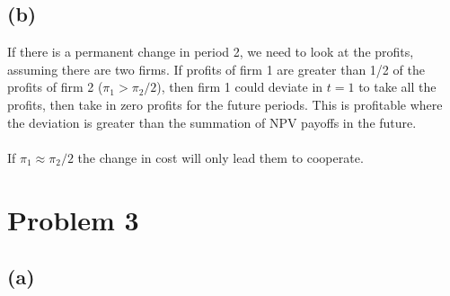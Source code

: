 \documentclass{article}
\begin{document}
\subsection*{(b)}
If there is a permanent change in period 2, we need to look at the profits, assuming there are two firms. If profits of firm 1 are greater than 1/2 of the profits of firm 2 ($\pi_1 > \pi_2/2$), then firm 1 could deviate in $t=1$ to take all the profits, then take in zero profits for the future periods. This is profitable where the deviation is greater than the summation of NPV payoffs in the future. 
\\
\\
If $\pi_1 \approx \pi_2/2$ the change in cost will only lead them to cooperate. 

\section{Problem 3}

\subsection*{(a)}
\end{document}
